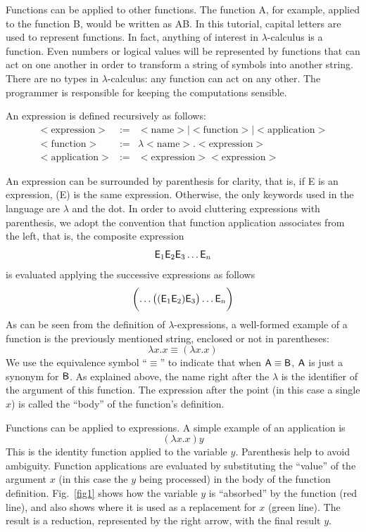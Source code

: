 \documentclass[12pt]{article}
\begin{document}
Functions can be applied to other functions. The function {\sf A}, for example, applied to the function {\sf B}, would be written as {\sf AB}. In this tutorial, capital letters are used to represent functions. In fact, anything of interest in $\lambda$-calculus is a function. Even numbers or logical values will be represented by functions that can act on one another in order to transform a string of symbols into another string. There are no types in $\lambda$-calculus: any function can act on any other. The programmer is responsible for keeping the computations sensible.

An expression is defined recursively as follows:
\begin{eqnarray*}
<{\mbox{expression}}> &:=& <{\mbox{name}}> \mid <{\mbox{function}}> \mid <{\mbox{application}}>\\
<{\mbox{function}}> &:=& \lambda <{\mbox{name}}>. <{\mbox{expression}}>\\
<{\mbox{application}}> &:=& <{\mbox{expression}}><{\mbox{expression}}>
\end{eqnarray*}

An expression can be surrounded by parenthesis for clarity, that is, if {\sf E} is an expression, ({\sf E}) is the same expression. Otherwise, the only keywords used in the language are $\lambda$ and the dot. In order to avoid cluttering expressions with parenthesis, we adopt the convention that function application associates from the left, that is, the composite expression
$${\sf E}_1{\sf E}_2{\sf E}_3\ldots {\sf E}_n$$
is evaluated applying the successive expressions as follows
$$\biggl(\ldots\bigl(({\sf E}_1{\sf E}_2){\sf E}_3\bigr)\ldots {\sf E}_n\biggr)$$
As can be seen from the definition of $\lambda$-expressions, a well-formed example of a function is the previously mentioned string, enclosed or not in parentheses:
$$
\lambda x.x \equiv (\lambda x.x)
$$
We use the equivalence symbol ``$\equiv$'' to indicate that when ${\sf A}\equiv {\sf B}$, ${\sf A}$ is just a synonym for  ${\sf B}$. As explained above, the name right after the $\lambda$ is the identifier of the argument of this function. The expression after the point (in this case a single $x$) is called the ``body'' of the function's definition.

Functions can be applied to expressions. A simple example of an application is 
$$(\lambda x.x)y$$
This is the identity function applied to the variable $y$. Parenthesis help to avoid ambiguity. Function applications are evaluated by substituting the ``value'' of the argument $x$ (in this case the $y$ being processed) in the body of the function definition. Fig.~\ref{fig1} shows how the variable $y$ is ``absorbed'' by the function (red line), and also shows where it is used as a replacement for $x$ (green line). The result is a reduction, represented by the right arrow, with the final result $y$.
\end{document}
